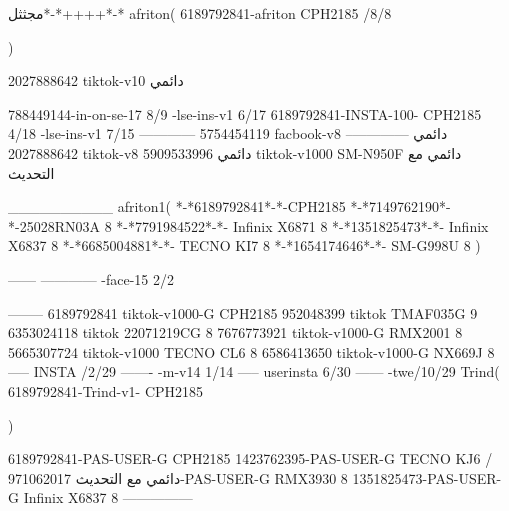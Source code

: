 مجثثل*-*++++*-*
afriton(
6189792841-afriton CPH2185  /8/8

)

2027888642 tiktok-v10
دائمي

788449144-in-on-se-17 8/9
-lse-ins-v1 6/17
6189792841-INSTA-100- CPH2185 4/18
-lse-ins-v1 7/15
------------
5754454119 facbook-v8
دائمي
--------------
2027888642 tiktok-v8
دائمي
5909533996 tiktok-v1000  SM-N950F
دائمي مع التحديث

__________
afriton1(
*-*6189792841*-*-CPH2185
*-*7149762190*-*-25028RN03A  8
*-*7791984522*-*- Infinix X6871  8
*-*1351825473*-*-  Infinix X6837   8
*-*6685004881*-*- TECNO KI7   8
*-*1654174646*-*- SM-G998U   8
)


------
------------
-face-15 2/2

--------
6189792841 tiktok-v1000-G CPH2185 
952048399 tiktok TMAF035G 9
6353024118 tiktok 22071219CG 8
7676773921 tiktok-v1000-G RMX2001  8
5665307724 tiktok-v1000 TECNO CL6  8
6586413650 tiktok-v1000-G NX669J  8
-----
 INSTA /2/29
-------
-m-v14 1/14
-----
userinsta 6/30
------
-twe/10/29
Trind(
6189792841-Trind-v1- CPH2185 

)


6189792841-PAS-USER-G CPH2185 
1423762395-PAS-USER-G TECNO KJ6  /دائمي مع التحديث
971062017-PAS-USER-G RMX3930 8
1351825473-PAS-USER-G  Infinix X6837  8
    ---------------

